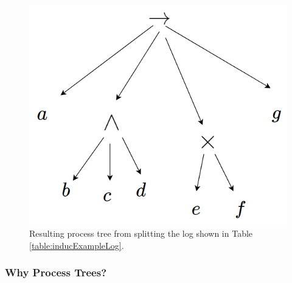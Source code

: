 \documentclass[a4paper,11pt]{article}
\begin{document}
\begin{figure}[H]
\centering
\includegraphics[width=.5\linewidth]{ProcessTree.png}
\caption{Resulting process tree from splitting the log shown in Table \ref{table:inducExampleLog}.}
\label{figure:processTree}
\end{figure}

\subsubsection{Why Process Trees?}




\end{document}
